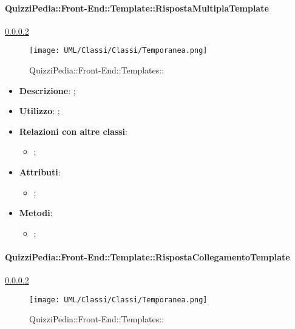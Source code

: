 		\paragraph{QuizziPedia::Front-End::Template::RispostaMultiplaTemplate}
		
				\label{QuizziPedia::Front-End::Templates::}
				\ref{QuizziPedia::Front-End::Templates::}
				\begin{figure}[h]
					\centering
					\texttt{[image: UML/Classi/Classi/Temporanea.png]}
					\caption{QuizziPedia::Front-End::Templates::}
				\end{figure}		
		
			\begin{itemize}
				\item \textbf{Descrizione}: ;
				\item \textbf{Utilizzo}: ;
				\item \textbf{Relazioni con altre classi}: 
				\begin{itemize}
					\item ;
				\end{itemize}
				\item \textbf{Attributi}: 
				\begin{itemize}
					\item ;
				\end{itemize}
				\item \textbf{Metodi}: 
				\begin{itemize}
					\item ;
				\end{itemize}
			\end{itemize}
		
		\paragraph{QuizziPedia::Front-End::Template::RispostaCollegamentoTemplate}
		
				\label{QuizziPedia::Front-End::Templates::}
				\ref{QuizziPedia::Front-End::Templates::}
				\begin{figure}[h]
					\centering
					\texttt{[image: UML/Classi/Classi/Temporanea.png]}
					\caption{QuizziPedia::Front-End::Templates::}
				\end{figure}
		
